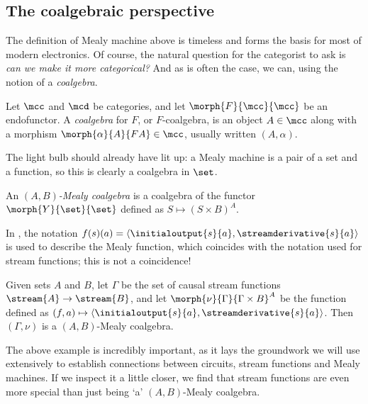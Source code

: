 \begin{example}
\end{example}

\subsection{The coalgebraic perspective}

The definition of Mealy machine above is timeless and forms the basis for most
of modern electronics.
Of course, the natural question for the categorist to ask is
\emph{can we make it more categorical?}
And as is often the case, we can, using the notion of a \emph{coalgebra}.

\begin{definition}[Coalgebra]
    Let \(\mcc\) and \(\mcd\) be categories, and let \(\morph{F}{\mcc}{\mcc}\)
    be an endofunctor.
    A \emph{coalgebra} for \(F\), or \(F\)-coalgebra, is an object
    \(A \in \mcc\) along with a morphism \(\morph{\alpha}{A}{FA} \in \mcc\),
    usually written \((A,\alpha)\).
\end{definition}

The light bulb should already have lit up: a Mealy machine is a pair of a set
and a function, so this is clearly a coalgebra in \(\set\).

\begin{definition}
    An \emph{\((A,B)\)-Mealy coalgebra} is a coalgebra of the functor
    \(\morph{Y}{\set}{\set}\) defined as \(S \mapsto (S \times B)^A\).
\end{definition}

\begin{example}
    In \cite{bonsangue2008coalgebraic}, the notation \(
    f(s)(a) = \langle{\initialoutput{s}{a},\streamderivative{s}{a}}\rangle
    \) is used to describe the Mealy function, which coincides with the notation
    used for stream functions; this is not a coincidence!

    Given sets \(A\) and \(B\), let \(\Gamma\) be the set of causal stream
    functions \(\stream{A} \to \stream{B}\), and let
    \(\morph{\nu}{\Gamma}{\Gamma \times B}^A\) be the function defined as \(
    (f, a) \mapsto \langle{\initialoutput{s}{a},\streamderivative{s}{a}}\rangle
    \).
    Then \((\Gamma,\nu)\) is a \((A,B)\)-Mealy coalgebra.
\end{example}

The above example is incredibly important, as it lays the groundwork we will
use extensively to establish connections between circuits, stream functions and
Mealy machines.
If we inspect it a little closer, we find that stream functions are even more
special than just being `a' \((A,B)\)-Mealy coalgebra.

